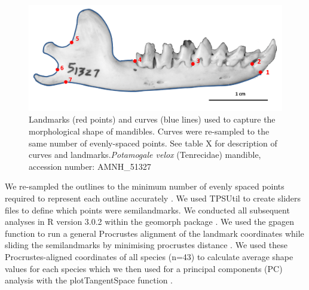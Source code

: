 \documentclass[12pt,a4paper]{article}
\begin{document}
\begin{table}[H]			
\centering
\caption{Descriptions of the landmarks (points) and curves (semilandmarks) for the skulls in dorsal view (see Figure \ref{fig:skdors_landmarks}).}
\label{tab:skdors_landmarks}  
\end{table}
\begin{figure}[H]
\centering
\includegraphics[width=1\linewidth]{figures/AMNH_51327_landmarksdiagram.png}

\caption{Landmarks (red points) and curves (blue lines) used to capture the morphological shape of mandibles. Curves were re-sampled to the same number of evenly-spaced points. See table X for description of curves and landmarks.\textit{Potamogale velox} (Tenrecidae) mandible, accession number: AMNH\_51327}
\label{fig:mands_landmarks}
\end{figure}


\begin{table}[H]			
\centering
\caption{Descriptions of the landmarks (points) and curves (semilandmarks) for the mandibles in lateral (buccal) view (see figure \ref{fig:mands_landmarks})}

\label{tab:mands_landmarks} %
\end{table}



We re-sampled the outlines to the minimum number of evenly spaced points required to represent each outline accurately \citep[][details in supplementary material]{MacLeod2013}. We used TPSUtil \citep{Rohlf2012} to create sliders files \citep{Zelditch2012} to define which points were semilandmarks. We conducted all subsequent analyses in R version 3.0.2 \citep[R Development Core][]{Team2013} within the geomorph package \citep{Adams2013}. We used the gpagen function to run a general Procrustes alignment \citep{Rohlf1993} of the landmark coordinates while sliding the semilandmarks by minimising procrustes distance \citep{Bookstein1997}. We used these Procrustes-aligned coordinates of all species (n=43) to calculate average shape values for each species which we then used for a principal components (PC) analysis with the plotTangentSpace function \citep{Adams2013}. 
\end{document}
